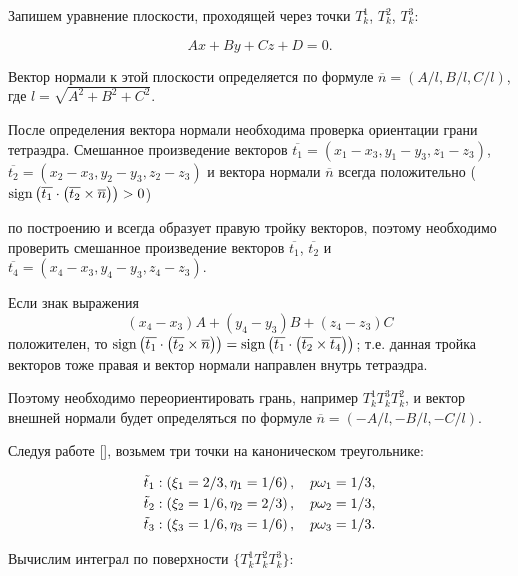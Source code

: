 Запишем уравнение плоскости, проходящей через точки $T^1_k$, $T^2_k$, $T^3_k$: 

$$Ax+By+Cz+D=0.$$

Вектор нормали к этой плоскости определяется по формуле $\overline{n}{=}\left({A}/{l},{B}/{l}, {C}/{l}\right)$, где $l=\sqrt{A^2+B^2+C^2}$. 

После определения вектора нормали необходима проверка ориентации грани тетраэдра. Смешанное произведение векторов $\overline{t_1}=\left(x_1-x_3, y_1-y_3,z_1-z_3\right)$, $\overline{t_2}=\left(x_2-x_3, y_2-y_3,z_2-z_3\right)$ и вектора нормали $\overline{n}$ всегда положительно ($\mathop{\rm sign}\left(\overline{t_1}\cdot\left(\overline{t_2}\times\overline{n}\right)\right)>0$)

по построению и всегда образует правую тройку векторов, поэтому необходимо проверить смешанное произведение векторов $\overline{t_1}$, $\overline{t_2}$ и $\overline{t_4}=\left(x_4-x_3,y_4-y_3,z_4-z_3\right)$. 

Если знак выражения $$\left(x_4-x_3\right)A+\left(y_4-y_3\right)B+

\left(z_4-z_3\right)C$$ положителен, то $\mathop{\rm sign}\left(\overline{t_1}\cdot\left(\overline{t_2}\times\overline{n}\right)\right)

=\mathop{\rm sign}\left(\overline{t_1}\cdot\left(\overline{t_2}\times\overline{t_4}\right)\right)$; т.е. данная тройка векторов тоже правая и вектор нормали направлен внутрь тетраэдра. 

Поэтому необходимо переориентировать грань, например $T^1_kT^3_kT^2_k$, и вектор внешней нормали будет определяться по формуле $\overline{n}=\left(-{A}/{l},-{B}/{l},-{C}/{l}\right)$.



Следуя работе [], возьмем три точки на каноническом треугольнике:

\begin{align}

&\tilde{t}_1:\left(\xi_1={2}/{3},\eta_1={1}/{6}\right), \quad p\omega_1={1}/{3},\notag\\

&\tilde{t}_2:\left(\xi_2={1}/{6},\eta_2={2}/{3}\right), \quad p\omega_2={1}/{3},\notag\\

&\tilde{t}_3:\left(\xi_3={1}/{6},\eta_3={1}/{6}\right), \quad p\omega_3={1}/{3}.\notag

\end{align}

Вычислим интеграл по поверхности $\{T^1_kT^2_kT^3_k\}$: 

